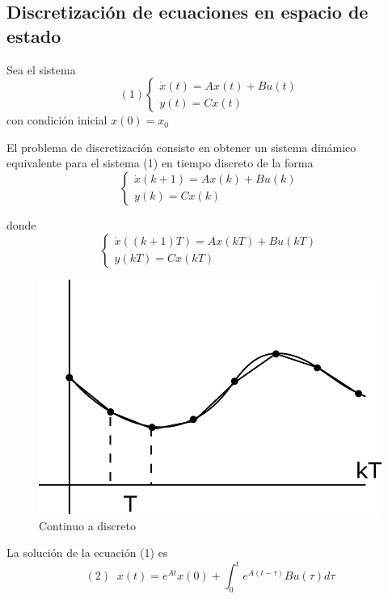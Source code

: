 \subsection{Discretización de ecuaciones en espacio de estado}

Sea el sistema
\[(1)
    \left\{
        \begin{array}{lll}
            \dot{x}(t) = Ax(t) + Bu(t) \\
            y(t) = Cx(t)
        \end{array}
    \right.
\]
con condición inicial \( x(0) = x_{0} \)

El problema de discretización consiste en obtener un sistema dinámico equivalente para el sistema (1) en tiempo discreto de la forma
\[
    \left\{
        \begin{array}{lll}
            \dot{x}(k+1) = Ax(k) + Bu(k) \\
            y(k) = Cx(k)
        \end{array}
    \right.
\]

donde
\[
    \left\{
        \begin{array}{lll}
            \dot{x}((k+1)T) = Ax(kT) + Bu(kT) \\
            y(kT) = Cx(kT)
        \end{array}
    \right.
\]

\begin{figure}[ht]
    \centering
        \includegraphics[scale=0.30]{Control de Sistemas Mecatronicos Figuras/20 Continuo a Discreto.png}
        \caption{Continuo a discreto}
\end{figure}

La solución de la ecuación (1) es 
\[
    (2) \;\; x(t) = e^{At}x(0) + \int_{0}^{t}e^{ A(t-\tau) }Bu(\tau)d\tau
\]


